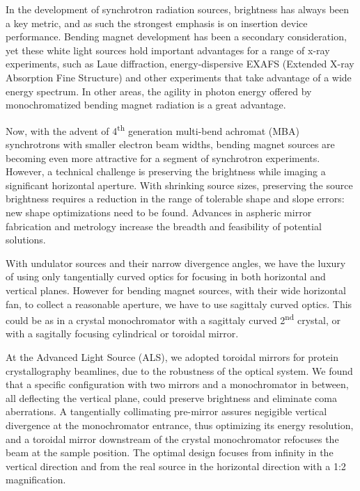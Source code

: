\documentclass[preprint]{iucr}       %
\newcommand{\inred}[1]{{\color{red}#1}}
\begin{document}
In the development of synchrotron radiation sources, brightness has always been a key metric, and as such the strongest emphasis is on insertion device performance. Bending magnet development has been a secondary consideration, yet these white light sources hold important advantages for a range of x-ray experiments, such as Laue diffraction, energy-dispersive EXAFS (Extended X-ray Absorption Fine Structure) and other experiments that take advantage of a wide energy spectrum. In other areas, the agility in photon energy offered by monochromatized bending magnet radiation is a great advantage. 

Now, with the advent of 4\textsuperscript{th} generation multi-bend achromat (MBA) synchrotrons with smaller electron beam widths, bending magnet sources are becoming even more attractive for a segment of synchrotron experiments. However, a technical challenge is preserving the brightness while imaging a significant horizontal aperture. With shrinking source sizes, preserving the source brightness requires a reduction in the range of tolerable shape and slope errors: new shape optimizations need to be found. Advances in aspheric mirror fabrication and metrology increase the breadth and feasibility of potential solutions.

With undulator sources and their narrow divergence angles, we have the luxury of using only tangentially curved optics for focusing in both horizontal and vertical planes. However for bending magnet sources, with their wide horizontal fan, to collect a reasonable aperture, we have to use sagittaly curved optics. This could be as in a crystal monochromator with a sagittaly curved 2\textsuperscript{nd} crystal, or with a sagitally focusing cylindrical or toroidal mirror.

At the Advanced Light Source (ALS), we adopted toroidal mirrors for protein crystallography beamlines, due to the robustness of the optical system. We found that a specific configuration \inred{with two mirrors and a monochromator in between, all deflecting  the vertical plane,} could preserve brightness and eliminate coma aberrations. 
A tangentially collimating pre-mirror \inred{assures negigible vertical divergence at the monochromator entrance, thus optimizing its energy resolution,} and a toroidal mirror downstream of the crystal monochromator \inred{refocuses the beam at the sample position.} The optimal design focuses from infinity in the vertical direction and from the real source in the horizontal direction with a 1:2 magnification.
\end{document}
